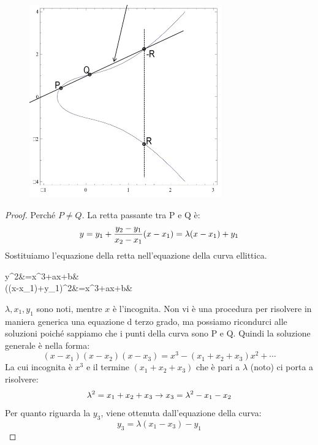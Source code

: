 \documentclass{book}
\newlength{\strutheight}
\begin{document}
\begin{adjustbox}{valign=C,raise=\strutheight,minipage={1.0\linewidth}}
	\begin{figure}
		\centering
		\includegraphics[scale=0.45]{2022-01-11-16-08-52.png}%
	\end{figure}%
	\strut{}
\vspace*{-0.5cm} %
	\begin{proof}
		Perché \(P\neq Q\).\newline
		La retta passante tra P e Q è:
		\begin{equation*}
			\centering
			y=y_{1}+\frac{y_{2}-y_{1}}{x_{2}-x_{1}}(x-x_{1})=\lambda(x-x_{1})+y_{1}
		\end{equation*}
			Sostituiamo l'equazione della retta nell'equazione della curva ellittica.
			\begin{flalign*}
				\centering
				y^{2}&=x^{3}+ax+b&\\
				{(\lambda(x-x_{1})+y_{1})}^2&=x^{3}+ax+b&
			\end{flalign*}
		\(\lambda ,x_{1},y_{1}\) sono noti, mentre \(x\) è l'incognita. Non vi è una procedura per risolvere in maniera generica una equazione d terzo grado, ma possiamo ricondurci alle soluzioni poiché sappiamo che i punti della curva sono P e Q. Quindi la soluzione generale è nella forma:\begin{equation*}
			(x-x_{1})(x-x_{2})(x-x_{3})=x^{3}-(x_{1}+x_{2}+x_{3})x^{2}+\cdots
		\end{equation*}
		La cui incognita è \(x^{3}\) e il termine \((x_{1}+x_{2}+x_{3})\) che è pari a \(\lambda \) (noto) ci porta a risolvere:\begin{equation*}
			\centering
			\lambda^{2}=x_{1}+x_{2}+x_{3}\rightarrow x_{3}=\lambda^{2}-x_{1}-x_{2}
		\end{equation*}
		Per quanto riguarda la \(y_{3}\), viene ottenuta dall'equazione della curva:\begin{equation*}
			y_{3}=\lambda (x_{1}-x_{3})-y_{1}
		\end{equation*}
	\end{proof}%
\end{adjustbox}
\end{document}
